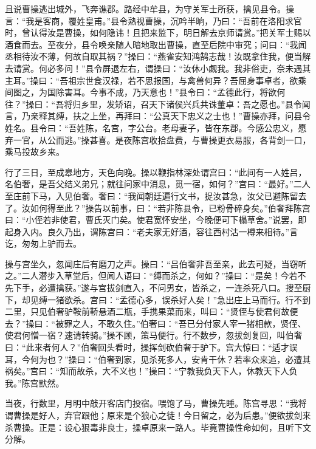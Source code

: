且说曹操逃出城外，飞奔谯郡。路经中牟县，为守关军士所获，擒见县令。操言：“我是客商，覆姓皇甫。”县令熟视曹操，沉吟半晌，乃曰：“吾前在洛阳求官时，曾认得汝是曹操，如何隐讳！且把来监下，明日解去京师请赏。”把关军士赐以酒食而去。至夜分，县令唤亲随人暗地取出曹操，直至后院中审究；问曰：“我闻丞相待汝不薄，何故自取其祸？”操曰：“燕雀安知鸿鹄志哉！汝既拿住我，便当解去请赏。何必多问！”县令屏退左右，谓操曰：“汝休小觑我。我非俗吏，奈未遇其主耳。”操曰：“吾祖宗世食汉禄，若不思报国，与禽兽何异？吾屈身事卓者，欲乘间图之，为国除害耳。今事不成，乃天意也！”县令曰：“孟德此行，将欲何往？”操曰：“吾将归乡里，发矫诏，召天下诸侯兴兵共诛董卓：吾之愿也。”县令闻言，乃亲释其缚，扶之上坐，再拜曰：“公真天下忠义之士也！”曹操亦拜，问县令姓名。县令曰：“吾姓陈，名宫，字公台。老母妻子，皆在东郡。今感公忠义，愿弃一官，从公而逃。”操甚喜。是夜陈宫收拾盘费，与曹操更衣易服，各背剑一口，乘马投故乡来。

行了三日，至成皋地方，天色向晚。操以鞭指林深处谓宫曰：“此间有一人姓吕，名伯奢，是吾父结义弟兄；就往问家中消息，觅一宿，如何？”宫曰：“最好。”二人至庄前下马，入见伯奢。奢曰：“我闻朝廷遍行文书，捉汝甚急，汝父已避陈留去了。汝如何得至此？”操告以前事，曰：“若非陈县令，已粉骨碎身矣。”伯奢拜陈宫曰：“小侄若非使君，曹氏灭门矣。使君宽怀安坐，今晚便可下榻草舍。”说罢，即起身入内。良久乃出，谓陈宫曰：“老夫家无好酒，容往西村沽一樽来相待。”言讫，匆匆上驴而去。

操与宫坐久，忽闻庄后有磨刀之声。操曰：“吕伯奢非吾至亲，此去可疑，当窃听之。”二人潜步入草堂后，但闻人语曰：“缚而杀之，何如？”操曰：“是矣！今若不先下手，必遭擒获。”遂与宫拔剑直入，不问男女，皆杀之，一连杀死八口。搜至厨下，却见缚一猪欲杀。宫曰：“孟德心多，误杀好人矣！”急出庄上马而行。行不到二里，只见伯奢驴鞍前鞒悬酒二瓶，手携果菜而来，叫曰：“贤侄与使君何故便去？”操曰：“被罪之人，不敢久住。”伯奢曰：“吾已分付家人宰一猪相款，贤侄、使君何憎一宿？速请转骑。”操不顾，策马便行。行不数步，忽拔剑复回，叫伯奢曰：“此来者何人？”伯奢回头看时，操挥剑砍伯奢于驴下。宫大惊曰：“适才误耳，今何为也？”操曰：“伯奢到家，见杀死多人，安肯干休？若率众来追，必遭其祸矣。”宫曰：“知而故杀，大不义也！”操曰：“宁教我负天下人，休教天下人负我。”陈宫默然。

当夜，行数里，月明中敲开客店门投宿。喂饱了马，曹操先睡。陈宫寻思：“我将谓曹操是好人，弃官跟他；原来是个狼心之徒！今日留之，必为后患。”便欲拔剑来杀曹操。正是：设心狠毒非良士，操卓原来一路人。毕竟曹操性命如何，且听下文分解。